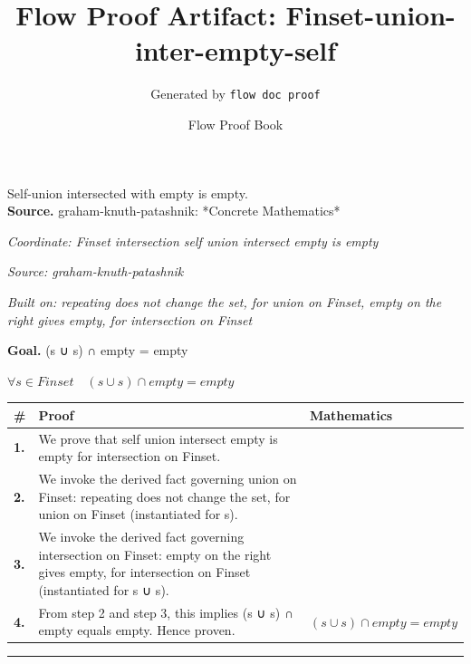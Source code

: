 \documentclass[11pt]{article}
\title{Flow Proof Artifact: Finset-union-inter-empty-self}
\author{Generated by \texttt{flow doc proof}}
\date{Flow Proof Book}
\theoremstyle{definition}
\begin{document}
\maketitle
Self-union intersected with empty is empty.\\[0.5em]
\textbf{Source.} graham-knuth-patashnik: *Concrete Mathematics*\\[0.5em]
\bigskip
{}\par
\smallskip\noindent\textit{Coordinate: Finset \cdot intersection \cdot self union intersect empty is empty}\par
\smallskip\noindent\textit{Source: graham-knuth-patashnik}\par
\smallskip\noindent\textit{Built on: repeating does not change the set, for union on Finset, empty on the right gives empty, for intersection on Finset}\par
\medskip
\noindent\textbf{Goal.} (s ∪ s) ∩ empty = empty\par
\noindent$\displaystyle \forall s \in Finset\quad (s ∪ s) ∩ empty = empty$\par
\medskip
\noindent
\begin{tabular}{@{} >{\raggedright\arraybackslash}p{} >{\raggedright\arraybackslash}p{} >{\raggedleft\arraybackslash}p{} @{}}
\textbf{\#} & \textbf{Proof} & \textbf{Mathematics} \\
\midrule
\textbf{1.} & We prove that self union intersect empty is empty for intersection on Finset. & \\[0.45em]
\textbf{2.} & We invoke the derived fact governing union on Finset: repeating does not change the set, for union on Finset (instantiated for s). & \\[0.45em]
\textbf{3.} & We invoke the derived fact governing intersection on Finset: empty on the right gives empty, for intersection on Finset (instantiated for s ∪ s). & \\[0.45em]
\textbf{4.} & From step 2 and step 3, this implies (s ∪ s) ∩ empty equals empty. Hence proven. & $\displaystyle (s ∪ s) ∩ empty = empty$ \\[0.45em]
\bottomrule
\end{tabular}
\label{thm:Finset-intersection-self_union_intersect_empty_is_empty}
\par\medskip\hrule
\end{document}
